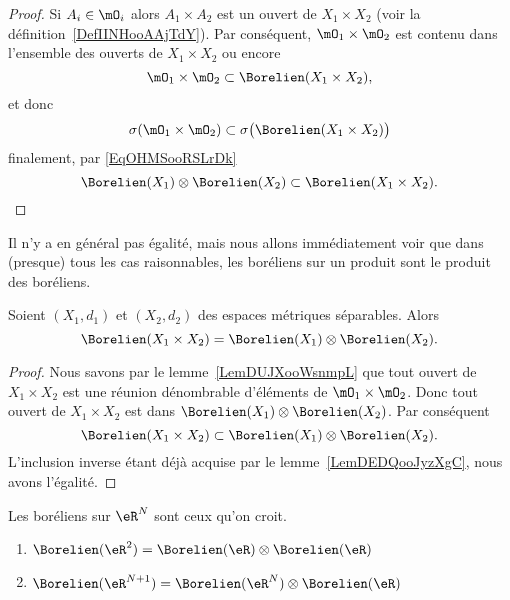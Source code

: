\begin{proof}
	Si \( A_i\in \mO_i\) alors \( A_1\times A_2\) est un ouvert de \( X_1\times X_2\) (voir la définition~\ref{DefIINHooAAjTdY}). Par conséquent, \( \mO_1\times \mO_2\) est contenu dans l'ensemble des ouverts de \( X_1\times X_2\) ou encore
	\begin{equation}
		\mO_1\times \mO_2\subset\Borelien(X_1\times X_2),
	\end{equation}
	et donc
	\begin{equation}
		\sigma(\mO_1\times \mO_2)\subset\sigma\big( \Borelien(X_1\times X_2) \big)
	\end{equation}
	finalement, par \eqref{EqOHMSooRSLrDk}
	\begin{equation}
		\Borelien(X_1)\otimes\Borelien(X_2)\subset\Borelien(X_1\times X_2).
	\end{equation}
\end{proof}

Il n'y a en général pas égalité, mais nous allons immédiatement voir que dans (presque) tous les cas raisonnables, les boréliens sur un produit sont le produit des boréliens.

\begin{proposition}        \label{PropNAAJooBPbjkX}
	Soient \( (X_1,d_1)\) et \( (X_2,d_2)\) des espaces métriques séparables. Alors
	\begin{equation}
		\Borelien(X_1\times X_2)=\Borelien(X_1)\otimes \Borelien(X_2).
	\end{equation}
\end{proposition}

\begin{proof}
	Nous savons par le lemme~\ref{LemDUJXooWsnmpL} que tout ouvert de \( X_1\times X_2\) est une réunion dénombrable d'éléments de \( \mO_1\times\mO_2\). Donc tout ouvert de \( X_1\times X_2\) est dans \( \Borelien(X_1)\otimes \Borelien(X_2)\). Par conséquent
	\begin{equation}
		\Borelien(X_1\times X_2)\subset \Borelien(X_1)\otimes \Borelien(X_2).
	\end{equation}
	L'inclusion inverse étant déjà acquise par le lemme~\ref{LemDEDQooJyzXgC}, nous avons l'égalité.
\end{proof}

\begin{proposition}     \label{CorWOOOooHcoEEF}
	Les boréliens sur \( \eR^N\) sont ceux qu'on croit.
	\begin{enumerate}
		\item
		      \( \Borelien(\eR^2)=\Borelien(\eR)\otimes \Borelien(\eR)\)
		\item
		      \( \Borelien(\eR^{N+1})=\Borelien(\eR^N)\otimes \Borelien(\eR)\)
	\end{enumerate}
\end{proposition}

